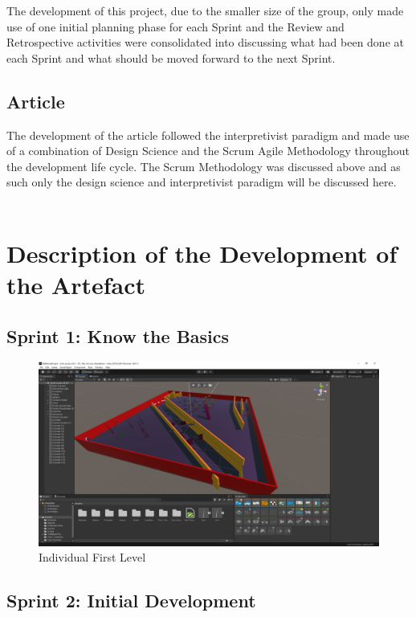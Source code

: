 \noindent The development of this project, due to the smaller size of the group, only made use of one initial planning phase for each Sprint and the Review and Retrospective activities were consolidated into discussing what had been done at each Sprint and what should be moved forward to the next Sprint.

\subsection{Article}
The development of the article followed the interpretivist paradigm and made use of a combination of Design Science and the Scrum Agile Methodology throughout the development life cycle. The Scrum Methodology was discussed above and as such only the design science and interpretivist paradigm will be discussed here. 
\\\\



\section{Description of the Development of the Artefact}

\subsection{Sprint 1: Know the Basics}

\begin{figure}[H]
\centering
\includegraphics[scale=0.33]{Figures/level.png}
\caption{Individual First Level}
\end{figure}


\subsection{Sprint 2: Initial Development}

